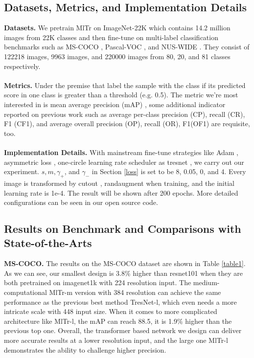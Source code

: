 \documentclass{article} \usepackage[numbers,sort&compress]{natbib}
\begin{document}
\subsection{Datasets, Metrics, and Implementation Details}
\textbf{Datasets.} We pretrain MlTr on ImageNet-22K \cite{deng2009imagenet} which contains 14.2 million images from 22K classes and then fine-tune on multi-label classification benchmarks such as MS-COCO \cite{lin2014microsoft}, Pascal-VOC \cite{everingham2010pascal}, and NUS-WIDE \cite{chua2009nus}. They consist of 122218 images, 9963 images, and 220000 images from 80, 20, and 81 classes respectively. \\\\
\textbf{Metrics.} Under the premise that label the sample with the class if its predicted score in one class is greater than a threshold  (e.g. 0.5). The metric we're most interested in is mean average precision (mAP) \cite{chen2019multi}, some additional indicator reported on previous work such as average per-class precision (CP), recall (CR), F1 (CF1), and average overall precision (OP), recall (OR), F1(OF1) are requisite, too.\\\\
\textbf{Implementation Details.} With mainstream fine-tune strategies like Adam \cite{loshchilov2017decoupled}, asymmetric loss \cite{ben2020asymmetric}, one-circle \cite{smith2018disciplined} learning rate scheduler as tresnet \cite{ridnik2021tresnet}, we carry out our experiment. $s, m, \gamma_+$, and $\gamma_-$ in Section \ref{loss} is set to be 8, 0.05, 0, and 4. Every image is transformed by cutout \cite{devries2017improved}, randaugment when training, and the initial learning rate is 1e-4. The result will be shown after 200 epochs. More detailed configurations can be seen in our open source code.


\subsection{Results on Benchmark and Comparisons with State-of-the-Arts}
\textbf{MS-COCO.} 
The results on the MS-COCO dataset are shown in Table \textcolor{red}{\ref{table1}}. As we can see, our smallest design is 3.8\% higher than resnet101 \cite{he2016deep} when they are both pretrained on imagenet1k with 224 resolution input. The medium-computational MlTr-m version with 384 resolution can achieve the same performance as the previous best method TresNet-l, which even needs a more intricate scale with 448 input size. When it comes to more complicated architecture like MlTr-l, the mAP can reach 88.5, it is 1.9\% higher than the previous top one. Overall, the transformer based network we design can deliver more accurate results at a lower resolution input, and the large one MlTr-l demonstrates the ability to challenge higher precision.
\end{document}
